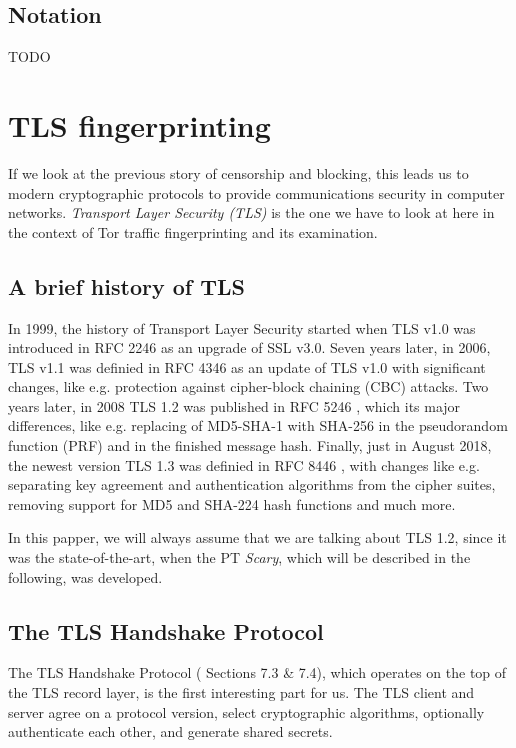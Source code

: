 \documentclass[sigconf, screen]{acmart}
\begin{document}
\subsection{Notation}
\label{ss:notation}
TODO
\section{TLS fingerprinting}
\label{s:tlsfingerprinting}
If we look at the previous story of censorship and blocking, this leads us to modern cryptographic protocols to provide communications security in computer networks. \textit{Transport Layer Security (TLS)} \cite{TLS_v1_2} is the one we have to look at here in the context of Tor traffic fingerprinting and its examination.
\subsection{A brief history of TLS}
\label{ss:abriefhistoryoftls}
In 1999, the history of Transport Layer Security started when TLS v1.0 was introduced in RFC 2246 \cite{TLS_v1_0} as an upgrade of SSL v3.0. Seven years later, in 2006, TLS v1.1 was definied in RFC 4346 \cite{TLS_v1_1} as an update of TLS v1.0 with significant changes, like e.g. protection against cipher-block chaining (CBC) attacks. Two years later, in 2008 TLS 1.2 was published in RFC 5246 \cite{TLS_v1_2}, which its major differences, like e.g. replacing of MD5-SHA-1 with SHA-256 in the pseudorandom function (PRF) and in the finished message hash. Finally, just in August 2018, the newest version TLS 1.3 was definied in RFC 8446 \cite{TLS_v1_3}, with changes like e.g. separating key agreement and authentication algorithms from the cipher suites, removing support for MD5 and SHA-224 hash functions and much more.

In this papper, we will always assume that we are talking about TLS 1.2, since it was the state-of-the-art, when the PT \textit{Scary}, which will be described in the following, was developed.
\subsection{The TLS Handshake Protocol}
\label{ss:thetlshandshakeprotocol}
The TLS Handshake Protocol (\cite{TLS_v1_2} Sections 7.3 \& 7.4), which operates on the top of the TLS record layer, is the first interesting part for us. The TLS client and server agree on a protocol version, select cryptographic algorithms, optionally authenticate each other, and generate shared secrets.
\end{document}

